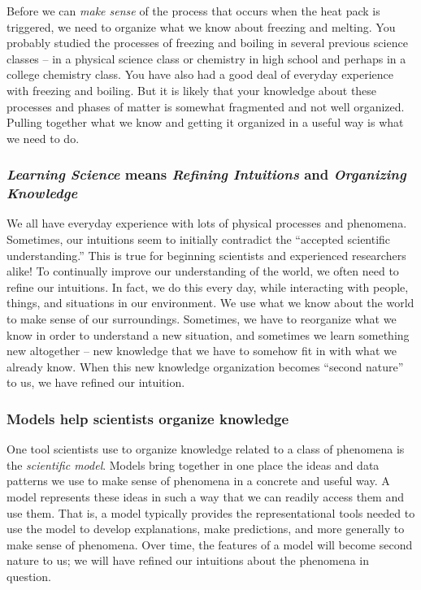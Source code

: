 \begin{reading}
\label{ReadingRefiningIntuitions}

	Before we can {\em make sense} of the process that occurs when the heat pack is triggered, we need to organize what we know about freezing and melting. You probably studied the processes of freezing and boiling in several previous science classes -- in a physical science class or chemistry in high school and perhaps in a college chemistry class. You have also had a good deal of everyday experience with freezing and boiling. But it is likely that your knowledge about these processes and phases of matter is somewhat fragmented and not well organized. Pulling together what we know and getting it organized in a useful way is what we need to do.

	\subsubsection*{{\em Learning Science} means {\em Refining Intuitions} and {\em Organizing Knowledge}}

	We all have everyday experience with lots of physical processes and phenomena. Sometimes, our intuitions seem to initially contradict the ``accepted scientific understanding.'' This is true for beginning scientists and experienced researchers alike! To continually improve our understanding of the world, we often need to refine our intuitions. In fact, we do this every day, while interacting with people, things, and situations in our environment. We use what we know about the world to make sense of our surroundings. Sometimes, we have to reorganize what we know in order to understand a new situation, and sometimes we learn something new altogether -- new knowledge that we have to somehow fit in with what we already know. When this new knowledge organization becomes ``second nature'' to us, we have refined our intuition. 

	\subsubsection*{Models help scientists organize knowledge}

	One tool scientists use to organize knowledge related to a class of phenomena is the {\em scientific model}. Models bring together in one place the ideas and data patterns we use to make sense of phenomena in a concrete and useful way. A model represents these ideas in such a way that we can readily access them and use them. That is, a model typically provides the representational tools needed to use the model to develop explanations, make predictions, and more generally to make sense of phenomena. Over time, the features of a model will become second nature to us; we will have refined our intuitions about the phenomena in question.

\end{reading}

